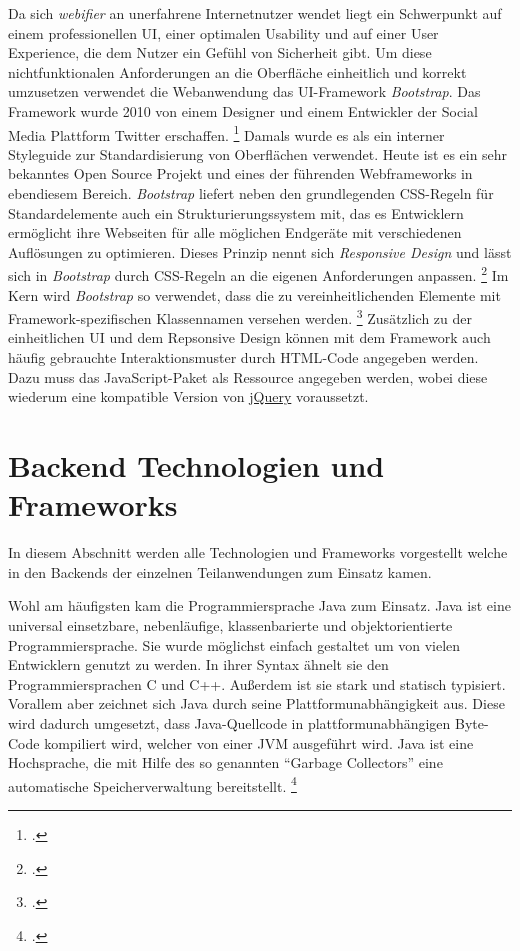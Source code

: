 Da sich \textit{webifier} an unerfahrene Internetnutzer wendet liegt ein Schwerpunkt auf
einem professionellen \ac{UI}, einer optimalen Usability und auf einer User Experience, die dem
Nutzer ein Gefühl von Sicherheit gibt.
Um diese nichtfunktionalen Anforderungen an die Oberfläche einheitlich und korrekt umzusetzen verwendet die Webanwendung das \ac{UI}-Framework \textit{Bootstrap}.
Das Framework wurde 2010 von einem Designer und einem Entwickler der Social Media Plattform Twitter erschaffen.
\footcite[Vgl.][1]{bootstrap}
Damals wurde es als ein interner Styleguide zur Standardisierung von Oberflächen verwendet.
Heute ist es ein sehr bekanntes Open Source Projekt und eines der führenden Webframeworks in ebendiesem Bereich.
\textit{Bootstrap} liefert neben den grundlegenden \ac{CSS}-Regeln für Standardelemente auch ein Strukturierungssystem mit, das es Entwicklern ermöglicht ihre Webseiten für alle möglichen Endgeräte mit verschiedenen Auflösungen zu optimieren.
Dieses Prinzip nennt sich \textit{Responsive Design} und lässt sich in \textit{Bootstrap} durch
\ac{CSS}-Regeln an die eigenen Anforderungen anpassen.
\footcite[Vgl.][7\psq]{bootstrap}
Im Kern wird \textit{Bootstrap} so verwendet, dass die zu vereinheitlichenden Elemente mit Framework-spezifischen Klassennamen versehen werden.
\footcite[Vgl.][4]{bootstrap}
Zusätzlich zu der einheitlichen \ac{UI} und dem Repsonsive Design können mit dem Framework auch
häufig gebrauchte Interaktionsmuster durch \ac{HTML}-Code angegeben werden.
Dazu muss das JavaScript-Paket als Ressource angegeben werden, wobei diese wiederum eine kompatible
Version von \hyperref[par:jquery]{jQuery} voraussetzt.

\section{Backend Technologien und Frameworks}

In diesem Abschnitt werden alle Technologien und Frameworks vorgestellt welche in den Backends der einzelnen Teilanwendungen zum Einsatz kamen.

\label{par:java}
Wohl am häufigsten kam die Programmiersprache Java zum Einsatz. Java ist eine universal einsetzbare,
nebenläufige, klassenbarierte und objektorientierte Programmiersprache. Sie wurde möglichst einfach
gestaltet um von vielen Entwicklern genutzt zu werden. In ihrer Syntax ähnelt sie den
Programmiersprachen C und C++. Außerdem ist sie stark und statisch typisiert. Vorallem aber
zeichnet sich Java durch seine Plattformunabhängigkeit aus. Diese wird dadurch umgesetzt, dass
Java-Quellcode in plattformunabhängigen Byte-Code kompiliert wird, welcher von einer \ac{JVM} ausgeführt wird. Java ist eine Hochsprache, die mit Hilfe des so genannten \enquote{Garbage Collectors} eine automatische Speicherverwaltung bereitstellt. \footcite[Vgl.][1]{javaspecification}

